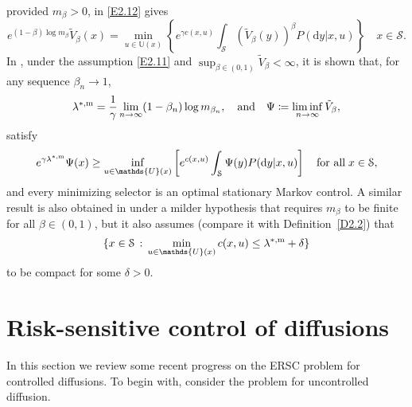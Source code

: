 \documentclass[notitlepage,11pt,reqno]{amsart}
\numberwithin{equation}{section}
\theoremstyle{plain}
\theoremstyle{definition}
\theoremstyle{remark}
\newcommand{\Act}{{\mathds{U}}}
\newcommand{\cS}{{\mathcal{S}}}     %
\newcommand{\lamstrdm}{\lambda^{*,{\rm m}}}
\newcommand{\D}{\mathrm{d}} %
\newcommand{\df}{\coloneqq}
\begin{document}
provided $m_\beta>0$,
in \eqref{E2.12} gives
\begin{equation*}
e^{(1-\beta)\log m_\beta}\tilde{V}_\beta(x)=\min_{u\in\Act(x)}\left\{e^{\gamma c(x, u)}\int_{\cS} (\tilde{V}_\beta(y))^\beta P(\D{y}|x, u)\right\}\quad x\in\cS.
\end{equation*}
In \cite{Jaskiewicz-07}, under the assumption \eqref{E2.11} and $\sup_{\beta\in(0,1)} \tilde{V}_\beta<\infty$, it is shown that, for any sequence $\beta_n\to 1$,
$$\lamstrdm=\frac{1}{\gamma}\lim_{n\to \infty} (1-\beta_n)\log m_{\beta_n}, \quad \text{and}\quad \Psi\df\liminf_{n\to\infty} \tilde{V}_\beta, $$
satisfy
$$e^{\gamma\lamstrdm} \Psi(x)\geq \inf_{u\in\Act(x)} \left[e^{c(x, u)} \int_{\cS} \Psi(y) P(\D{y}|x, u)\right]\quad \text{for all}\; x\in \cS,$$
and every minimizing selector is an optimal stationary Markov control. A similar result is also obtained in \cite[Theorem~5.2]{MR2585141} under a milder hypothesis
that requires $m_\beta$ to be finite for all $\beta\in(0, 1)$, but it also assumes (compare it with Definition~\ref{D2.2}) that
$$\{x\in\cS\, :\, \min_{u\in\Act(x)} c(x, u)\leq \lamstrdm + \delta\}$$
to be compact for some $\delta>0$.


\section{Risk-sensitive control of diffusions}
In this section we review some recent progress on the ERSC problem for controlled diffusions. To begin with,  consider the problem for uncontrolled diffusion.
\end{document}
